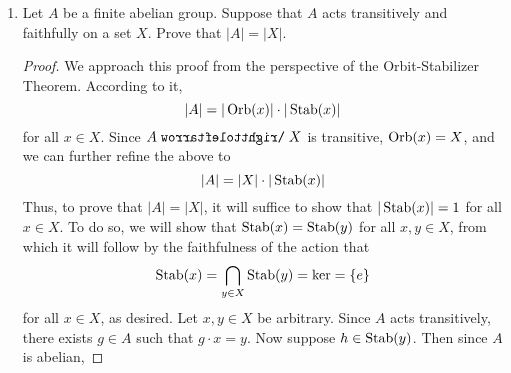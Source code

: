 \documentclass[../psets.tex]{subfiles}
\begin{document}
\begin{enumerate}
\begin{enumerate}
\begin{proof}
            and that $S_{13}$ is the smallest symmetric group to contain such an element. Thus, we can map
            \begin{equation*}
                r \mapsto (1,2,3,4)(5,6,7,8,9,10,11,12,13)
            \end{equation*}
            Additionally, we can geometrically picture separate rotations of a 4-gon and a 9-gon to motivate choosing the following as a reflection element.
            \begin{equation*}
                s \mapsto (2,4)(6,13)(7,12)(8,11)(9,10)
            \end{equation*}
            Together, these elements satisfy the relations
            \begin{align*}
                r^{36} &= s^2 = e&
                rs &= sr^{-1}
            \end{align*}
            which characterize $D_{72}$. Therefore, we take
            \begin{equation*}
                \boxed{n = 13}
            \end{equation*}
        \end{proof}
    \end{enumerate}
    \item Let $A$ be a finite abelian group. Suppose that $A$ acts transitively and faithfully on a set $X$. Prove that $|A|=|X|$.
    \begin{proof}
        We approach this proof from the perspective of the Orbit-Stabilizer Theorem. According to it,
        \begin{equation*}
            |A| = |\operatorname{Orb}(x)|\cdot|\operatorname{Stab}(x)|
        \end{equation*}
        for all $x\in X$. Since $A\acts X$ is transitive, $\operatorname{Orb}(x)=X$, and we can further refine the above to
        \begin{equation*}
            |A| = |X|\cdot|\operatorname{Stab}(x)|
        \end{equation*}
        Thus, to prove that $|A|=|X|$, it will suffice to show that $|\operatorname{Stab}(x)|=1$ for all $x\in X$. To do so, we will show that $\operatorname{Stab}(x)=\operatorname{Stab}(y)$ for all $x,y\in X$, from which it will follow by the faithfulness of the action that
        \begin{equation*}
            \operatorname{Stab}(x) = \bigcap_{y\in X}\operatorname{Stab}(y)
            = \ker
            = \{e\}
        \end{equation*}
        for all $x\in X$, as desired. Let $x,y\in X$ be arbitrary. Since $A$ acts transitively, there exists $g\in A$ such that $g\cdot x=y$. Now suppose $h\in\operatorname{Stab}(y)$. Then since $A$ is abelian,

\end{proof}
\end{enumerate}
\end{document}
